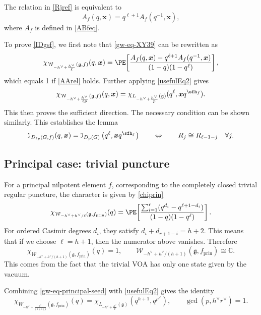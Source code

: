 \documentclass[a4paper,11pt]{article}
\theoremstyle{definition}
\theoremstyle{definition}
\theoremstyle{remark}
\newcommand{\prin}{ \text{prin}}
\newcommand{\be}{\begin{equation}}
\newcommand{\ee}{\end{equation}}
\begin{document}
The relation in \eqref{Rjref} is equivalent to 
\be\label{AArel}
A_f(q,\bm x)
=
q^{\ell+1}A_f(q^{-1},\bm x),
\ee
where $A_f$ is defined in \eqref{ABfeq}.

To prove \eqref{IDgsf}, we first note that \eqref{gw-eq-XY39} can be   rewritten as 
  \be 
\chi_{\mathcal W_{-h^\vee+\frac{h^\vee}{\ell}}(\mathfrak g,f)}(q,\bm x)
 =\PE\!\left[
 \frac{A_f(q,\bm x) -q^{\ell +1}A_f(q^{-1},\bm x)}
 {(1-q)(1-q^\ell)}\right],  
\ee 
which equals 1 if \eqref{AArel} holds.  Further applying  \eqref{usefulEq2} gives
  \be 
  \chi_{\mathcal W_{-h^\vee+\frac{h^\vee}{ \ell p }}(\mathfrak g,f)}(q,\bm x)
 = 
 \chi_{L_{-h^\vee+\frac{h^\vee}{ p   }}(\mathfrak g)}(q^\ell,\bm x q^{\sfh_f}).
\ee
% 
This then proves the  sufficient direction. The necessary condition can be shown similarly. 
This   establishes the lemma
 \be\label{fsfsflema}
\mathcal I_{D_{\ell p}(G,f)}(q,\bm x)
=\mathcal I_{D_p(G)}
\left(q^\ell,\bm xq^{\sfh_f}\right)\qquad \Leftrightarrow \qquad
R_j\cong R_{\ell-1-j}
\quad \forall j.
\ee 




 
\subsection{Principal case: trivial puncture}
\label{gw-subsec-principal}

For a principal  nilpotent element $f$, corresponding to the completely closed trivial regular puncture, the character is given by  \eqref{chiprin}
%
\be \label{chiprin2}
 \chi_{\mathcal W_{-h^\vee+h^\vee/\ell}(\mathfrak g,f_\prin)}(q )
 =\PE\!\left[
 \frac{\sum_{i=1}^r (q^{d_i}-q^{\ell+1-d_i }) }
 {(1-q)(1-q^{ \ell})}\right].
\ee
For ordered Casimir degrees $d_i$, they satisfy $d_i+d_{r+1-i}=h+2$. This means that if we choose $\ell=h+1$, then  the numerator  above vanishes.  Therefore
\be
 \chi_{\mathcal W_{-h^\vee+h^\vee/ (h+1)}(\mathfrak g,f_\prin)}(q )=1,
 \qquad
\mathcal W_{-h^\vee+h^\vee/ (h+1)}(\mathfrak g,f_\prin) \cong\mathbb C.
 \label{gw-eq-principal-seed}
\ee
This comes from the fact that the trivial VOA has only  one state given by the vacuum.  

 Combining  \eqref{gw-eq-principal-seed} with  \eqref{usefulEq2} gives the identity
\be 
  \chi_{  W_{-h^\vee+\frac{h^\vee}{ (h+1) p }}(\mathfrak g,f_\prin)}(q)
 =  \chi_{  L_{-h^\vee+\frac{h^\vee}{   p }}(\mathfrak g )}(q^{h+1},q^{\rho^\vee}),\qquad
 \gcd(p,h^\vee r^\vee)=1.
  \label{gw-eq-principal-general}
\ee
\end{document}
